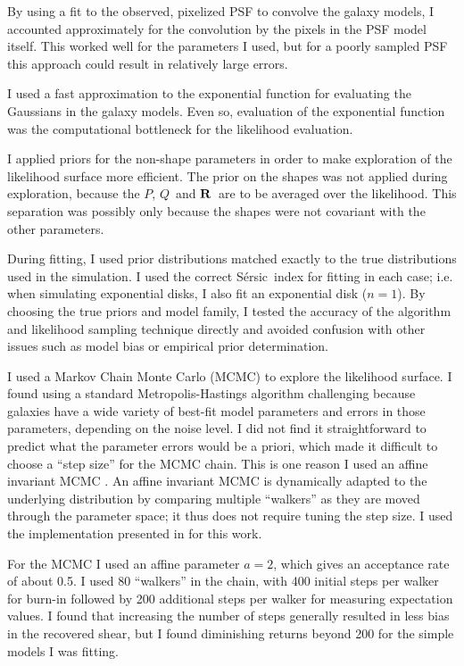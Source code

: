 \documentclass[usegraphicx,usenatbib]{mn2e}
\newcommand{\vecQ}{\mbox{\boldmath $Q$}}
\newcommand{\matR}{\mbox{$\bf R$}}
\newcommand{\sersic}{S\'{e}rsic}
\begin{document}
By using a fit to the observed, pixelized PSF to convolve the galaxy models, I
accounted approximately for the convolution by the pixels in the PSF model
itself.  This worked well for the parameters I used, but for a poorly sampled
PSF this approach could result in relatively large errors.

I used a fast approximation to the exponential function for evaluating the
Gaussians in the galaxy models.  Even so, evaluation of the exponential
function was the computational bottleneck for the likelihood evaluation.

I applied priors for the non-shape parameters in order to make exploration of
the likelihood surface more efficient.  The prior on the shapes was not applied
during exploration, because the $P$, \vecQ\ and \matR\ are to be averaged over
the likelihood.  This separation was possibly only because the shapes were not
covariant with the other parameters.

During fitting, I used prior distributions matched exactly to the true
distributions used in the simulation.  I used the correct \sersic\ index for
fitting in each case; i.e. when simulating exponential disks, I also fit an
exponential disk ($n=1$).  By choosing the true priors and model family, I
tested the accuracy of the algorithm and likelihood sampling technique directly
and avoided confusion with other issues such as model bias or empirical prior
determination.

I used a Markov Chain Monte Carlo (MCMC) to explore the likelihood surface.  I
found using a standard Metropolis-Hastings algorithm \citep{Metropolis53}
challenging because galaxies have a wide variety of best-fit model parameters
and errors in those parameters, depending on the noise level.  I did not find
it straightforward to predict what the parameter errors would be a priori,
which made it difficult to choose a ``step size'' for the MCMC chain.  This is
one reason I used an affine invariant MCMC \citep{GoodmanWeare10}.  An affine
invariant MCMC is dynamically adapted to the underlying distribution by
comparing multiple ``walkers'' as they are moved through the parameter space;
it thus does not require tuning the step size.  I used the implementation
presented in \citet{Mackey13} for this work.

For the MCMC I used an affine parameter $a=2$, which gives an acceptance rate
of about 0.5. I used 80 ``walkers'' in the chain, with 400 initial steps per
walker for burn-in followed by 200 additional steps per walker for measuring
expectation values.  I found that increasing the number of steps generally
resulted in less bias in the recovered shear, but I found diminishing returns
beyond 200 for the simple models I was fitting.
\end{document}
